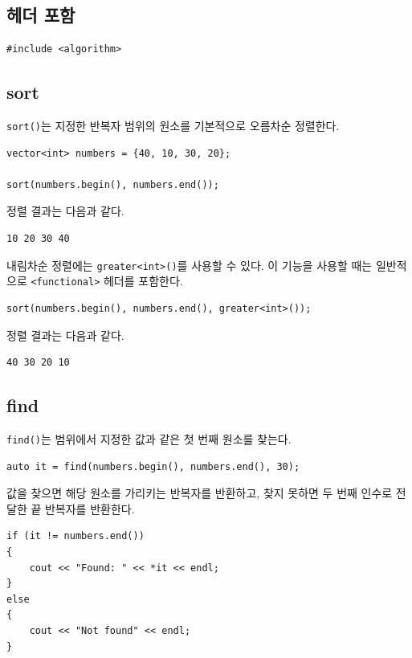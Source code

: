 \documentclass[11pt,a4paper]{article}
\begin{document}
\subsection{헤더 포함}
\begin{lstlisting}
#include <algorithm>
\end{lstlisting}

\subsection{sort}
\texttt{sort()}는 지정한 반복자 범위의 원소를 기본적으로 오름차순 정렬한다.

\begin{lstlisting}
vector<int> numbers = {40, 10, 30, 20};

sort(numbers.begin(), numbers.end());
\end{lstlisting}

정렬 결과는 다음과 같다.

\begin{verbatim}
10 20 30 40
\end{verbatim}

내림차순 정렬에는 \texttt{greater<int>()}를 사용할 수 있다. 이 기능을 사용할 때는 일반적으로 \texttt{<functional>} 헤더를 포함한다.

\begin{lstlisting}
sort(numbers.begin(), numbers.end(), greater<int>());
\end{lstlisting}

정렬 결과는 다음과 같다.

\begin{verbatim}
40 30 20 10
\end{verbatim}

\subsection{find}
\texttt{find()}는 범위에서 지정한 값과 같은 첫 번째 원소를 찾는다.

\begin{lstlisting}
auto it = find(numbers.begin(), numbers.end(), 30);
\end{lstlisting}

값을 찾으면 해당 원소를 가리키는 반복자를 반환하고, 찾지 못하면 두 번째 인수로 전달한 끝 반복자를 반환한다.

\begin{lstlisting}
if (it != numbers.end())
{
    cout << "Found: " << *it << endl;
}
else
{
    cout << "Not found" << endl;
}
\end{lstlisting}
\end{document}
